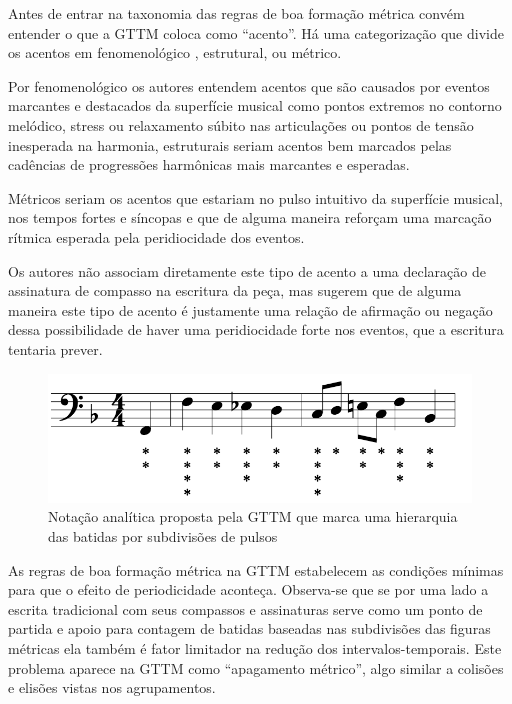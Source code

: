 \documentclass[
	12pt,				%
	openright,			%
	twoside,			%
	a4paper,			%
	english,			%
	french,				%
	spanish,			%
	brazil				%
	]{abntex2}
\begin{document}
Antes de entrar na taxonomia das regras de boa formação métrica convém entender o que a GTTM coloca como “acento”. Há uma categorização que divide os acentos em fenomenológico , estrutural, ou métrico.

Por fenomenológico os autores entendem acentos que são causados por eventos marcantes e destacados da superfície musical como pontos extremos no contorno melódico, stress ou relaxamento súbito nas articulações ou pontos de tensão inesperada na harmonia, estruturais seriam acentos bem marcados pelas cadências de progressões harmônicas mais marcantes e esperadas.

Métricos seriam os acentos que estariam no pulso intuitivo da superfície musical, nos tempos fortes e síncopas e que de alguma maneira reforçam uma marcação rítmica esperada pela peridiocidade dos eventos. 

Os autores não associam diretamente este tipo de acento a uma declaração de assinatura de compasso na escritura da peça, mas sugerem que de alguma maneira este tipo de acento é justamente uma relação de afirmação ou negação dessa possibilidade de haver uma peridiocidade forte nos eventos, que a escritura tentaria prever. 


\begin{figure}[htb]
	\caption{\label{fig_grafico}Notação analítica proposta pela GTTM que marca uma hierarquia das batidas por subdivisões de pulsos}
	\begin{center}
	    \includegraphics[scale=0.45]{gttm/GTTM-m21-metes.png}
	\end{center}
\end{figure}


As regras de boa formação métrica na GTTM estabelecem as condições mínimas para que o efeito de periodicidade aconteça.  Observa-se que se por uma lado a escrita tradicional com seus compassos e assinaturas serve como um ponto de partida e apoio para contagem de batidas baseadas nas subdivisões das figuras métricas ela também é fator limitador na redução dos intervalos-temporais. Este problema aparece na GTTM como “apagamento métrico”\cite[pg.101]{lerdahl1983generative}, algo similar a colisões e elisões vistas nos agrupamentos. 
\end{document}
